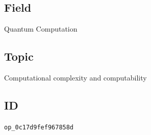 \subsection*{Field}

Quantum Computation

\subsection*{Topic}

Computational complexity and computability

\subsection*{ID}

\texttt{op\_0c17d9fef967858d}
